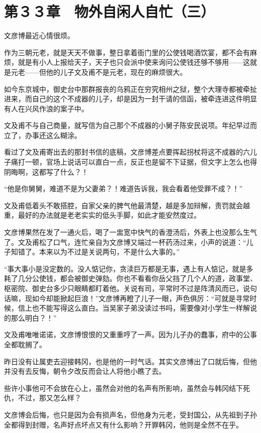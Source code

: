 \section{第３３章　物外自闲人自忙（三）}

文彦博最近心情很烦。

作为三朝元老，就是天天不做事，整日拿着衙门里的公使钱喝酒饮宴，都不会有麻烦，就是有小人上报给天子，天子也只会派中使来询问公使钱还够不够用——这就是元老——但他的儿子文及甫不是元老，现在的麻烦很大。

如今东京城中，御史台中那群报丧的乌鸦正在穷究相州之狱，整个大理寺都被牵扯进来，而自己的这个不成器的儿子，却是因为一封干请的信函，被牵连进这件明显有人在兴风作浪的案子中。

文及甫不与自己商量，就写信为自己那个不成器的小舅子陈安民说项。年纪早过而立了，办事还这么糊涂。

看过了文及甫寄出去的那封书信的底稿，文彦博差点要挥起拐杖将这不成器的六儿子痛打一顿，官场上说话可以直白一点，反正也是留不下证据，但文字上怎么也得阴晦啊，这都写了什么？！

“他是你舅舅，难道不是为父妻弟？！难道告诉我，我会看着他受罪不成？！”

文及甫低着头不敢搭腔，自家父亲的脾气他最清楚，越是多加辩解，责罚就会越重，最好的办法就是老老实实的低头手脚，如此才能安然度过。

文彦博果然在发了一通火后，喝了一盅宽中快气的香澄汤后，外表上也没那么生气了。文及甫松了口气，连忙亲自为文彦博又端过一杯药汤过来，小声的说道：“儿子知错了。本来以为不过是关说两句，不是什么大事的。”

“事大事小是没定数的。没人惦记你，贪渎巨万都是无事，遇上有人惦记，就是多耗了几分公使钱，都会被御史弹劾。你也不看看你岳父挡了几个人的道，政事堂、枢密院、御史台多少只眼睛都盯着他。关说有司，平常时不过是阵清风而已，说句话嘛，现如今却能掀起巨浪！”文彦博再瞪了儿子一眼，声色俱厉：“可就是寻常时候，信上也不能写得这么直白。当吴家子弟没读过书吗，需要像对小学生一样解说的那么明白？！”

文及甫唯唯诺诺，文彦博恨恨的又重重哼了一声。因为儿子办的蠢事，府中的公事全都耽搁了。

昨日没有让属吏去迎接韩冈，也是他的一时气话。其实文彦博出了口就后悔，但他并没有去反悔，朝令夕改反而会让人将他小瞧了去。

些许小事他可不会放在心上，虽然会对他的名声有所影响，虽然会与韩冈结下死仇，不过，那又怎么样？

文彦博会后悔，也只是因为会有损声名，但他身为元老，受封国公，从先祖到子孙全都得到封赠，名声好点坏点又有什么影响？开罪韩冈，他则是全然不在乎。

